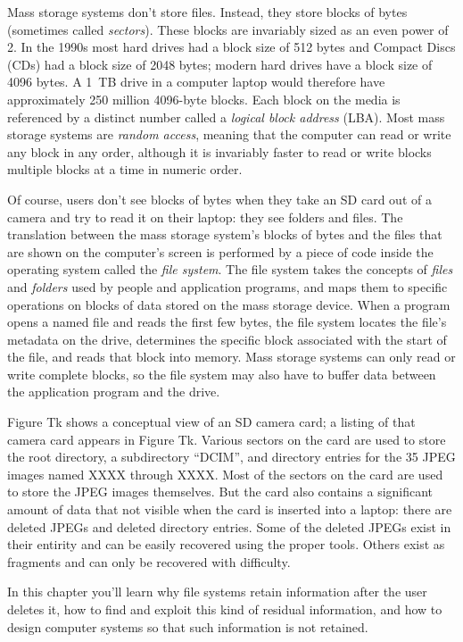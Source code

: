 \documentclass[11pt,letter]{book}
\begin{document}
Mass storage systems don't store files. Instead, they store blocks of
bytes (sometimes called \emph{sectors}). These blocks are invariably
sized as an even power of 2. In the 1990s most hard drives had a block
size of 512 bytes and Compact Discs (CDs) had a block size of 2048
bytes; modern hard drives have a block size of 4096 bytes. A 1~TB
drive in a computer laptop would therefore have approximately 250
million 4096-byte blocks. Each block on the media is referenced
by a distinct number called a \emph{logical block address} (LBA). Most
mass storage systems are \emph{random access}, meaning that the
computer can read or write any block in any order, although it is
invariably faster to read or write blocks multiple blocks at a time in numeric order.

Of course, users don't see blocks of bytes when they take an SD card
out of a camera and try to read it on their laptop: they see folders
and files. The  translation between the mass storage system's blocks
of bytes and the files that are shown on the computer's screen is
performed by a piece of code inside the operating system called the
\emph{file system}.   The file system takes the concepts of
\emph{files} and \emph{folders} used by people and application
programs, and maps them to specific operations on blocks of data
stored on the mass storage device. When a program opens a named file
and reads the first few bytes, the file system locates the file's
metadata on the drive, determines the specific block associated with
the start of the file, and reads that block into memory. Mass
storage systems can only read or write complete blocks, so the file
system may also have to buffer data between the application program
and the drive.

Figure Tk shows a conceptual view of an SD camera card; a listing of
that camera card appears in Figure Tk. Various sectors on the card are
used to store the root directory, a subdirectory ``DCIM'', and
directory entries for the 35 JPEG
images named XXXX through XXXX. Most of the sectors on the card are
used to store the JPEG images themselves. But the card also contains a
significant amount of data that not visible when the card is
inserted into a laptop: there are deleted JPEGs and deleted directory
entries. Some of the deleted JPEGs exist in their entirity and can be
easily recovered using the proper tools. Others exist as fragments and
can only be recovered with difficulty. 

In this chapter you'll learn why file systems retain information after the
user deletes it, how to find and exploit this kind of residual
information, and how to design computer systems so that such
information is not retained.
\end{document}
